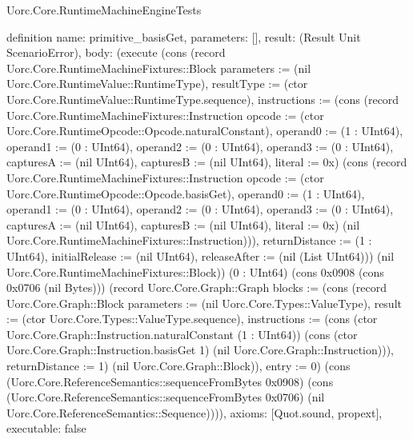 \begin{lexlean}{Uorc.Core.RuntimeMachineEngineTests}
\begin{semanticmodule}
definition{
  name: primitive_basisGet,
  parameters: [],
  result: (Result Unit ScenarioError),
  body: (execute (cons (record Uorc.Core.RuntimeMachineFixtures::Block {parameters := (nil Uorc.Core.RuntimeValue::RuntimeType), resultType := (ctor Uorc.Core.RuntimeValue::RuntimeType.sequence), instructions := (cons (record Uorc.Core.RuntimeMachineFixtures::Instruction {opcode := (ctor Uorc.Core.RuntimeOpcode::Opcode.naturalConstant), operand0 := (1 : UInt64), operand1 := (0 : UInt64), operand2 := (0 : UInt64), operand3 := (0 : UInt64), capturesA := (nil UInt64), capturesB := (nil UInt64), literal := 0x}) (cons (record Uorc.Core.RuntimeMachineFixtures::Instruction {opcode := (ctor Uorc.Core.RuntimeOpcode::Opcode.basisGet), operand0 := (1 : UInt64), operand1 := (0 : UInt64), operand2 := (0 : UInt64), operand3 := (0 : UInt64), capturesA := (nil UInt64), capturesB := (nil UInt64), literal := 0x}) (nil Uorc.Core.RuntimeMachineFixtures::Instruction))), returnDistance := (1 : UInt64), initialRelease := (nil UInt64), releaseAfter := (nil (List UInt64))}) (nil Uorc.Core.RuntimeMachineFixtures::Block)) (0 : UInt64) (cons 0x0908 (cons 0x0706 (nil Bytes))) (record Uorc.Core.Graph::Graph {blocks := (cons (record Uorc.Core.Graph::Block {parameters := (nil Uorc.Core.Types::ValueType), result := (ctor Uorc.Core.Types::ValueType.sequence), instructions := (cons (ctor Uorc.Core.Graph::Instruction.naturalConstant (1 : UInt64)) (cons (ctor Uorc.Core.Graph::Instruction.basisGet 1) (nil Uorc.Core.Graph::Instruction))), returnDistance := 1}) (nil Uorc.Core.Graph::Block)), entry := 0}) (cons (Uorc.Core.ReferenceSemantics::sequenceFromBytes 0x0908) (cons (Uorc.Core.ReferenceSemantics::sequenceFromBytes 0x0706) (nil Uorc.Core.ReferenceSemantics::Sequence)))),
  axioms: [Quot.sound, propext],
  executable: false
}


\end{semanticmodule}
\end{lexlean}
